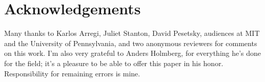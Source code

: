 \documentclass[output=paper]{LSP/langsci}
\begin{document}
\section{Acknowledgements}

Many thanks to Karlos Arregi, Juliet Stanton, David Pesetsky, audiences at MIT and the University of Pennsylvania, and two anonymous reviewers for comments on this work. I'm also very grateful to Anders Holmberg, for everything he's done for the field; it's a pleasure to be able to offer this paper in his honor. Responsibility for remaining errors is mine.

{\sloppy\printbibliography[heading=subbibliography,notkeyword=this]}
\end{document}
